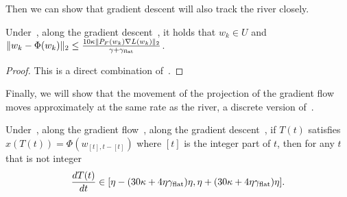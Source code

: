Then we can show that gradient descent will also track the river closely.

\begin{lemma}
\label{lem:gdclose}
    Under~, along the gradient descent~, it holds that $w_k \in U$ and $\| w_k- \Phi(w_k) \|_2 \le \frac{10 \kappa \| {P}_F(w_{k}) \nabla L(w_{k})\|_2}{\gamma + \gamma_{\mathrm{flat}}}$.
\end{lemma}
\begin{proof}
    This is a direct combination of~.
\end{proof}


Finally, we will show that the movement of the projection of the gradient flow moves approximately at the same rate as the river, a discrete version of~.

\begin{lemma}
\label{lem:gdspeedcalc}
    Under~, along the gradient flow~, along the gradient descent~, if $T(t)$ satisfies $x(T(t)) = \Phi(w_{[t], t - [t]})$ where $[t]$ is the integer part of $t$, then for any $t$ that is not integer
\begin{align*}
    \frac{d T(t)}{d t} \in [\eta - (30 \kappa + 4\eta\gamma_{\mathrm{flat}})\eta, \eta + (30 \kappa + 4\eta\gamma_{\mathrm{flat}})\eta].
\end{align*}
\end{lemma}

